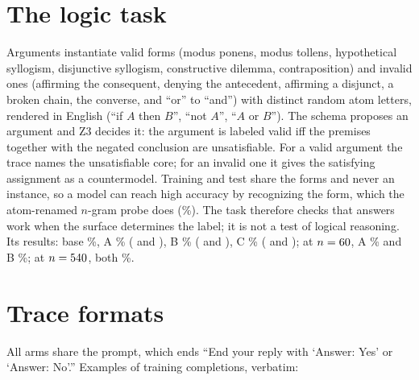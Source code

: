 \documentclass{article}
\theoremstyle{definition}
\begin{document}
\section{The logic task}
\label{app:logic}
Arguments instantiate \nFormsHalf{} valid forms (modus ponens, modus tollens, hypothetical syllogism, disjunctive syllogism, constructive dilemma, contraposition) and \nFormsHalf{} invalid ones (affirming the consequent, denying the antecedent, affirming a disjunct, a broken chain, the converse, and ``or'' to ``and'') with distinct random atom letters, rendered in English (``if $A$ then $B$'', ``not $A$'', ``$A$ or $B$''). The schema proposes an argument and Z3 decides it: the argument is labeled valid iff the premises together with the negated conclusion are unsatisfiable. For a valid argument the trace names the unsatisfiable core; for an invalid one it gives the satisfying assignment as a countermodel. Training and test share the \nForms{} forms and never an instance, so a model can reach high accuracy by recognizing the form, which the atom-renamed $n$-gram probe does (\validProbe\%). The task therefore checks that answers work when the surface determines the label; it is not a test of logical reasoning. Its results: base \validBase\%, A \validA\% (\validAsZero{} and \validAsOne), B \validB\% (\validBsZero{} and \validBsOne), C \validC\% (\validCsZero{} and \validCsOne); at $n=60$, A \validAsmall\% and B \validBsmall\%; at $n=540$, both \validAlarge\%.

\section{Trace formats}
\label{app:formats}
All arms share the prompt, which ends ``End your reply with `Answer: Yes' or `Answer: No'.'' Examples of training completions, verbatim:
\end{document}
